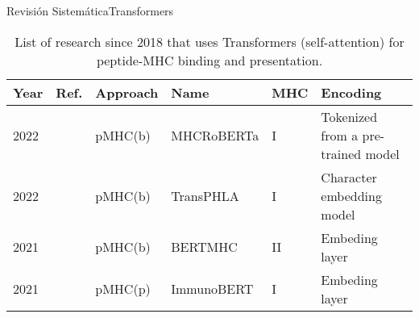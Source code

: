 \documentclass[10pt]{beamer}
\newcommand{\1}{
	\setbeamertemplate{background}{
		\texttt{[image: img/1]}
		\tikz[overlay] \fill[fill opacity=0.75,fill=white] (0,0) rectangle (-\paperwidth,\paperheight);
	}
}
\begin{document}
\begin{frame}{Revisión Sistemática}{Transformers}
	
	\fontsize{8pt}{5pt}\selectfont
	
	\begin{table}[]
		\centering
		\caption{List of research since 2018 that uses Transformers (self-attention) for peptide-MHC binding and presentation.}		
		\setlength{\tabcolsep}{0.5em} %
		{\renewcommand{\arraystretch}{2}%
			\begin{tabular}{p{0.6cm}p{0.6cm}p{1.5cm}p{2cm}p{0.6cm}p{2.7cm}}
				\textbf{Year} & \textbf{Ref.}                                  & \textbf{Approach}        & \textbf{Name} & \textbf{MHC} & \textbf{Encoding}                                                                                                                                                                                                         \\ \hline
				2022          & \cite{wang2022mhcroberta}     & pMHC(b)      & MHCRoBERTa    & I        & Tokenized from a pre-trained model               \\
				2022          & \cite{chu2022transformer}     & pMHC(b)      & TransPHLA     & I        & Character embedding model           \\
				2021          & \cite{cheng2021bertmhc}       & pMHC(b)      & BERTMHC       & II       & Embeding layer                           \\
				2021          & \cite{gasser2021interpreting} & pMHC(p) & ImmunoBERT    & I        & Embeding layer             
			\end{tabular}
		}
	\end{table}	
\end{frame}
\end{document}

